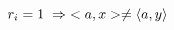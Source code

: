 \documentclass[preview]{standalone}
\begin{document}
\begin{center}
$r_i=1 \hspace{0.1cm}\Rightarrow\hspace{0.1cm} <a, x> \neq \langle a,y \rangle$
\end{center}
\end{document}
